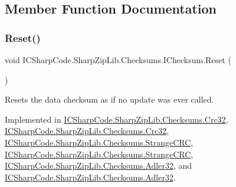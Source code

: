 \subsection{Member Function Documentation}
\mbox{\label{interface_i_c_sharp_code_1_1_sharp_zip_lib_1_1_checksums_1_1_i_checksum_a43ef0e6e9e22a503da94790835a0a384}} 
\subsubsection{\texorpdfstring{Reset()}{Reset()}\hspace{0.1cm}{\footnotesize\ttfamily [1/2]}}
{\footnotesize\ttfamily void I\+C\+Sharp\+Code.\+Sharp\+Zip\+Lib.\+Checksums.\+I\+Checksum.\+Reset (\begin{DoxyParamCaption}{ }\end{DoxyParamCaption})}



Resets the data checksum as if no update was ever called. 



Implemented in \hyperlink{class_i_c_sharp_code_1_1_sharp_zip_lib_1_1_checksums_1_1_crc32_a6d0a7a926c3b6f8aea03897a2dc40b07}{I\+C\+Sharp\+Code.\+Sharp\+Zip\+Lib.\+Checksums.\+Crc32}, \hyperlink{class_i_c_sharp_code_1_1_sharp_zip_lib_1_1_checksums_1_1_crc32_a6d0a7a926c3b6f8aea03897a2dc40b07}{I\+C\+Sharp\+Code.\+Sharp\+Zip\+Lib.\+Checksums.\+Crc32}, \hyperlink{class_i_c_sharp_code_1_1_sharp_zip_lib_1_1_checksums_1_1_strange_c_r_c_aca2448f26ffa4b9350696a62352b6673}{I\+C\+Sharp\+Code.\+Sharp\+Zip\+Lib.\+Checksums.\+Strange\+C\+RC}, \hyperlink{class_i_c_sharp_code_1_1_sharp_zip_lib_1_1_checksums_1_1_strange_c_r_c_aca2448f26ffa4b9350696a62352b6673}{I\+C\+Sharp\+Code.\+Sharp\+Zip\+Lib.\+Checksums.\+Strange\+C\+RC}, \hyperlink{class_i_c_sharp_code_1_1_sharp_zip_lib_1_1_checksums_1_1_adler32_ab508a341e82f164dfbb744188614caeb}{I\+C\+Sharp\+Code.\+Sharp\+Zip\+Lib.\+Checksums.\+Adler32}, and \hyperlink{class_i_c_sharp_code_1_1_sharp_zip_lib_1_1_checksums_1_1_adler32_ab508a341e82f164dfbb744188614caeb}{I\+C\+Sharp\+Code.\+Sharp\+Zip\+Lib.\+Checksums.\+Adler32}.

